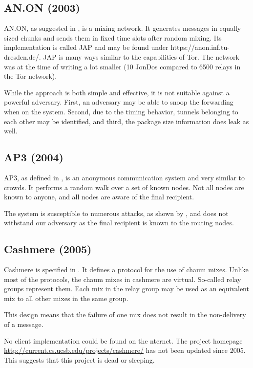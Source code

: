 \subsection{AN.ON (2003)}
AN.ON, as suggested in \cite{federrath2003system}, is a mixing network. It generates messages in equally sized chunks and sends them in fixed time slots after random mixing. Its implementation is called JAP and may be found under https://anon.inf.tu-dresden.de/. JAP is many ways similar to the capabilities of Tor. The network was at the time of writing a lot smaller (10 JonDos compared to 6500 relays in the Tor network).

While the approach is both simple and effective, it is not suitable against a powerful adversary. First, an adversary may be able{\tiny } to snoop the forwarding when on the system. Second, due to the timing behavior, tunnels belonging to each other may be identified, and third, the package size information does leak as well.


\subsection{AP3 (2004)}
AP3, as defined in \cite{mislove2004ap3}, is an anonymous communication system and very similar to crowds. It performs a random walk over a set of known nodes. Not all nodes are known to anyone, and all nodes are aware of the final recipient. 

The system is susceptible to numerous attacks, as shown by \cite{ccs2008:mittal}, and does not withstand our adversary as the final recipient is known to the routing nodes.

\subsection{Cashmere (2005)}
Cashmere is specified in \cite{zhuang2005cashmere}. It defines a protocol for the use of chaum mixes. Unlike most of the protocols, the chaum mixes in cashmere are virtual. So-called relay groups represent them. Each mix in the relay group may be used as an equivalent mix to all other mixes in the same group. 

This design means that the failure of one mix does not result in the non-delivery of a message.

No client implementation could be found on the \textit{}nternet. The project homepage \href{http://current.cs.ucsb.edu/projects/cashmere/}{http://current.cs.ucsb.edu/projects/cashmere/} has not been updated since 2005. This suggests that this project is dead or sleeping.

